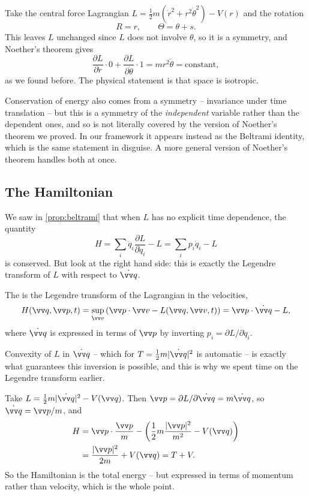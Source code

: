 \documentclass[a4paper]{scrartcl}
\begin{document}
\begin{example}
	Take the central force Lagrangian $L = \frac12 m(\dot r^2 + r^2\dot\theta^2) - V(r)$ and the rotation
	$$
	R = r, \qquad \Theta = \theta + s.
	$$
	This leaves $L$ unchanged since $L$ does not involve $\theta$, so it is a symmetry, and Noether's theorem gives
	$$
	\frac{\partial L}{\partial \dot r}\cdot 0 + \frac{\partial L}{\partial \dot\theta}\cdot 1 = mr^2\dot\theta = \text{constant},
	$$
	as we found before. The physical statement is that space is isotropic.
\end{example}

\begin{remark}
	Conservation of energy also comes from a symmetry -- invariance under time translation -- but this is a symmetry of the \emph{independent} variable rather than the dependent ones, and so is not literally covered by the version of Noether's theorem we proved. In our framework it appears instead as the Beltrami identity, which is the same statement in disguise. A more general version of Noether's theorem handles both at once.
\end{remark}

\subsection{The Hamiltonian}

We saw in \autoref{prop:beltrami} that when $L$ has no explicit time dependence, the quantity
$$
H = \sum_i \dot q_i \frac{\partial L}{\partial \dot q_i} - L = \sum_i p_i \dot q_i - L
$$
is conserved. But look at the right hand side: this is exactly the Legendre transform of $L$ with respect to $\dot{\vv q}$.

\begin{definition}[Hamiltonian]
	The  is the Legendre transform of the Lagrangian in the velocities,
	$$
	H(\vv q, \vv p, t) = \sup_{\vv v}\left(\vv p \cdot \vv v - L(\vv q, \vv v, t)\right) = \vv p \cdot \dot{\vv q} - L,
	$$
	where $\dot{\vv q}$ is expressed in terms of $\vv p$ by inverting $p_i = \partial L/\partial \dot q_i$.
\end{definition}

Convexity of $L$ in $\dot{\vv q}$ -- which for $T = \frac12 m|\dot{\vv q}|^2$ is automatic -- is exactly what guarantees this inversion is possible, and this is why we spent time on the Legendre transform earlier.

\begin{example}
	Take $L = \frac12 m|\dot{\vv q}|^2 - V(\vv q)$. Then $\vv p = \partial L/\partial \dot{\vv q} = m\dot{\vv q}$, so $\dot{\vv q} = \vv p/m$, and
	\begin{align*}
		H &= \vv p \cdot \frac{\vv p}{m} - \left(\frac{1}{2}m\frac{|\vv p|^2}{m^2} - V(\vv q)\right) \\
		&= \frac{|\vv p|^2}{2m} + V(\vv q) = T + V.
	\end{align*}
	So the Hamiltonian is the total energy -- but expressed in terms of momentum rather than velocity, which is the whole point.
\end{example}
\end{document}
